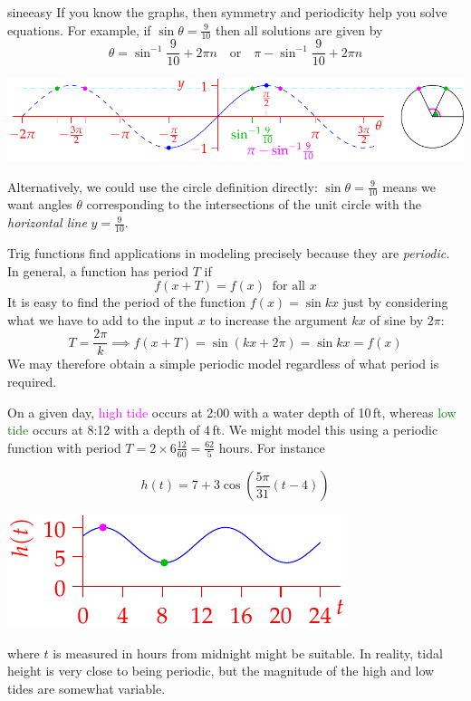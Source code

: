 \begin{example}{}{sineeasy}
	If you know the graphs, then symmetry and periodicity help you solve equations. For example, if $\sin \theta=\frac 9{10}$ then all solutions are given by
	\[
		\theta=\sin^{-1}\frac 9{10}+2\pi n
		\quad\text{or}\quad 
		\pi-\sin^{-1}\frac 9{10}+2\pi n \tag{$n$ is any integer}
	\]
	\begin{center}
		\includegraphics[scale=0.95]{invsine3}
	\end{center}
	Alternatively, we could use the circle definition directly: $\sin\theta=\frac 9{10}$ means we want angles $\theta$ corresponding to the intersections of the unit circle with the \emph{horizontal line} $y=\frac 9{10}$.
\end{example}


\goodbreak



Trig functions find applications in modeling precisely because they are \emph{periodic.} In general, a function has period $T$ if
\[
	f(x+T)=f(x)\ \text{ for all $x$}
\]
It is easy to find the period of the function $f(x)=\sin kx$ just by considering what we have to add to the input $x$ to increase the argument $kx$ of sine by $2\pi$:
\[
	T=\frac{2\pi}k\implies f(x+T)=\sin(kx+2\pi)=\sin kx=f(x)
\]
We may therefore obtain a simple periodic model regardless of what period is required.

\begin{example}{}{}
	On a given day, \textcolor{Magenta}{high tide} occurs at 2:00 with a water depth of 10\,ft, whereas \textcolor{Green}{low tide} occurs at 8:12 with a depth of 4\,ft. We might model this using a periodic function with period $T=2\times 6\frac{12}{60}=\frac{62}{5}$ hours. For instance\par
	\begin{minipage}[t]{0.6\linewidth}\vspace{-8pt}
		\[
			h(t)=7+3\cos\left(\frac{5\pi}{31}(t-4)\right)
		\] 
	\end{minipage}
	\hfill
	\begin{minipage}[t]{0.39\linewidth}\vspace{-18pt}
		\flushright\includegraphics{tide}
	\end{minipage}\medbreak
	where $t$ is measured in hours from midnight might be suitable. In reality, tidal height is very close to being periodic, but the magnitude of the high and low tides are somewhat variable.
\end{example}


